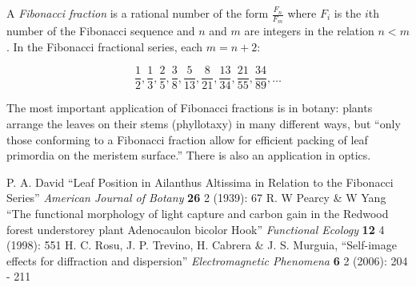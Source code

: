 \documentclass[12pt]{article}
\begin{document}
A {\em Fibonacci fraction} is a rational number of the form $\frac{F_n}{F_m}$ where $F_i$ is the $i$th number of the Fibonacci sequence and $n$ and $m$ are integers in the relation $n < m$. In the Fibonacci fractional series, each $m = n + 2$:

$$\frac{1}{2}, \frac{1}{3}, \frac{2}{5}, \frac{3}{8}, \frac{5}{13}, \frac{8}{21}, \frac{13}{34}, \frac{21}{55}, \frac{34}{89}, \ldots$$

The most important application of Fibonacci fractions is in botany: plants arrange the leaves on their stems (phyllotaxy) in many different ways, but ``only those conforming to a Fibonacci fraction allow for efficient packing of leaf primordia on the meristem surface.'' There is also an application in optics.

\begin{thebibliography}{3}
 P. A. David ``Leaf Position in Ailanthus Altissima in Relation to the Fibonacci Series'' {\it American Journal of Botany} {\bf 26} 2 (1939): 67
 R. W Pearcy \& W Yang ``The functional morphology of light capture and carbon gain in the Redwood forest understorey plant Adenocaulon bicolor Hook'' {\it Functional Ecology} {\bf 12} 4 (1998): 551
 H. C. Rosu, J. P. Trevino, H. Cabrera \& J. S. Murguia, ``Self-image effects for diffraction and dispersion'' {\it Electromagnetic Phenomena} {\bf 6} 2 (2006): 204 - 211
\end{thebibliography}
\end{document}
